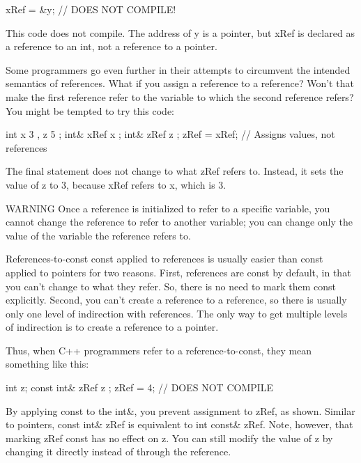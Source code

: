 \begin{cpp}
xRef = &y; // DOES NOT COMPILE!
\end{cpp}

This code does not compile. The address of y is a pointer, but xRef is declared as a reference to an int, not a reference to a pointer.

Some programmers go even further in their attempts to circumvent the intended semantics of references. What if you assign a reference to a reference? Won’t that make the first reference refer to the variable to which the second reference refers? You might be tempted to try this code:

\begin{cpp}
int x { 3 }, z { 5 };
int& xRef { x };
int& zRef { z };
zRef = xRef; // Assigns values, not references
\end{cpp}

The final statement does not change to what zRef refers to. Instead, it sets the value of z to 3, because xRef refers to x, which is 3.

\begin{myWarning}{WARNING}
Once a reference is initialized to refer to a specific variable, you cannot change the reference to refer to another variable; you can change only the value of the variable the reference refers to.
\end{myWarning}

References-to-const
const applied to references is usually easier than const applied to pointers for two reasons. First, references are const by default, in that you can’t change to what they refer. So, there is no need to mark them const explicitly. Second, you can’t create a reference to a reference, so there is usually only one level of indirection with references. The only way to get multiple levels of indirection is to create a reference to a pointer.

Thus, when C++ programmers refer to a reference-to-const, they mean something like this:

\begin{cpp}
int z;
const int& zRef { z };
zRef = 4; // DOES NOT COMPILE
\end{cpp}

By applying const to the int\&, you prevent assignment to zRef, as shown. Similar to pointers, const int\& zRef is equivalent to int const\& zRef. Note, however, that marking zRef const has no effect on z. You can still modify the value of z by changing it directly instead of through the reference.

